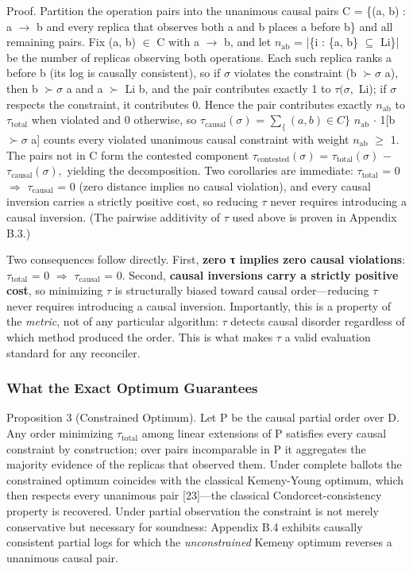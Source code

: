 \documentclass[11pt]{article}
\begin{document}
Proof. Partition the operation pairs into the unanimous causal pairs C = \{(a, b) : a $\rightarrow $ b and every replica that observes both a and b places a before b\} and all remaining pairs. Fix (a, b) $\in $ C with a $\rightarrow $ b, and let $n_{\mathrm{ab}}$ = |\{i : \{a, b\} $\subseteq $ Li\}| be the number of replicas observing both operations. Each such replica ranks a before b (its log is causally consistent), so if $\sigma $ violates the constraint (b $\succ \sigma $ a), then b $\succ \sigma $ a and a $\succ $ Li b, and the pair contributes exactly 1 to $\tau (\sigma ,$ Li); if $\sigma $ respects the constraint, it contributes 0. Hence the pair contributes exactly $n_{\mathrm{ab}}$ to $\tau _{\mathrm{total}}$ when violated and 0 otherwise, so $\tau _{\mathrm{causal}}(\sigma )$ = $\sum _\{(a,b)\in C\}$ $n_{\mathrm{ab}}$ $\cdot $ 1[b $\succ \sigma $ a] counts every violated unanimous causal constraint with weight $n_{\mathrm{ab}}$ $\geq $ 1. The pairs not in C form the contested component $\tau _{\mathrm{contested}}(\sigma )$ = $\tau _{\mathrm{total}}(\sigma )$ $-$ $\tau _{\mathrm{causal}}(\sigma ),$ yielding the decomposition. Two corollaries are immediate: $\tau _{\mathrm{total}}$ = 0 $\Rightarrow $ $\tau _{\mathrm{causal}}$ = 0 (zero distance implies no causal violation), and every causal inversion carries a strictly positive cost, so reducing $\tau $ never requires introducing a causal inversion. (The pairwise additivity of $\tau $ used above is proven in Appendix B.3.)

Two consequences follow directly. First, \textbf{zero τ implies zero causal violations}: $\tau _{\mathrm{total}}$ = 0 $\Rightarrow $ $\tau _{\mathrm{causal}}$ = 0. Second, \textbf{causal inversions carry a strictly positive cost}, so minimizing $\tau $ is structurally biased toward causal order—reducing $\tau $ never requires introducing a causal inversion. Importantly, this is a property of the \emph{metric}, not of any particular algorithm: $\tau $ detects causal disorder regardless of which method produced the order. This is what makes $\tau $ a valid evaluation standard for any reconciler.

\subsubsection{What the Exact Optimum Guarantees}
Proposition 3 (Constrained Optimum). Let P be the causal partial order over D. Any order minimizing $\tau _{\mathrm{total}}$ among linear extensions of P satisfies every causal constraint by construction; over pairs incomparable in P it aggregates the majority evidence of the replicas that observed them. Under complete ballots the constrained optimum coincides with the classical Kemeny-Young optimum, which then respects every unanimous pair [23]—the classical Condorcet-consistency property is recovered. Under partial observation the constraint is not merely conservative but necessary for soundness: Appendix B.4 exhibits causally consistent partial logs for which the \emph{unconstrained} Kemeny optimum reverses a unanimous causal pair.
\end{document}
